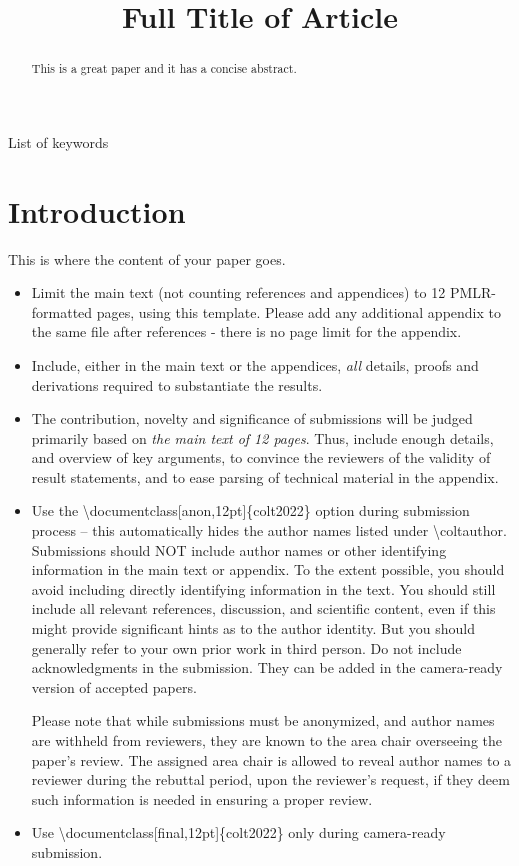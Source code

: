 \documentclass[anon,12pt]{colt2022} %
\title[Short Title]{Full Title of Article}
\begin{document}
\maketitle

\begin{abstract}%
  This is a great paper and it has a concise abstract.%
\end{abstract}

\begin{keywords}%
  List of keywords%
\end{keywords}

\section{Introduction}

This is where the content of your paper goes.
\begin{itemize}
  \item Limit the main text (not counting references and appendices) to 12 PMLR-formatted pages, using this template. Please add any additional appendix to the same file after references - there is no page limit for the appendix.
  \item Include, either in the main text or the appendices, \emph{all} details, proofs and derivations required to substantiate the results.
  \item The contribution, novelty and significance of submissions will be judged primarily based on
\textit{the main text of 12 pages}. Thus, include enough details, and overview of key arguments, 
to convince the reviewers of the validity of result statements, and to ease parsing of technical material in the appendix.
  \item Use the \textbackslash documentclass[anon,12pt]\{colt2022\} option during submission process -- this automatically hides the author names listed under \textbackslash coltauthor. Submissions should NOT include author names or other identifying information in the main text or appendix. To the extent possible, you should avoid including directly identifying information in the text. You should still include all relevant references, discussion, and scientific content, even if this might provide significant hints as to the author identity. But you should generally refer to your own prior work in third person. Do not include acknowledgments in the submission. They can be added in the camera-ready version of accepted papers. 
  
  Please note that while submissions must be anonymized, and author names are withheld from reviewers, they are known to the area chair overseeing the paper’s review.  The assigned area chair is allowed to reveal author names to a reviewer during the rebuttal period, upon the reviewer’s request, if they deem such information is needed in ensuring a proper review.  
  \item Use \textbackslash documentclass[final,12pt]\{colt2022\} only during camera-ready submission.
\end{itemize}
\end{document}
